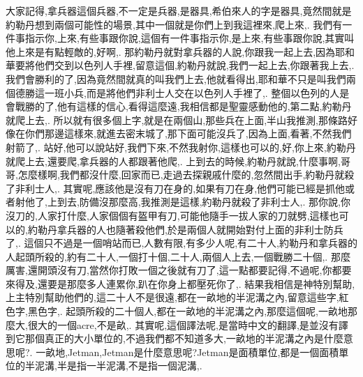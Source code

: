 \documentclass{book}
\begin{document}
大家記得,拿兵器這個兵器,不一定是兵器,是器具,希伯來人的字是器具,竟然間就是約勒丹想到兩個可能性的場景,其中一個就是你們上到我這裡來,爬上來,.
我們有一件事指示你,上來,有些事跟你說,這個有一件事指示你,是上來,有些事跟你說,其實叫他上來是有點輕敵的,好啊,.
那約勒丹就對拿兵器的人說,你跟我一起上去,因為耶和華要將他們交到以色列人手裡,留意這個,約勒丹就說,我們一起上去,你跟著我上去,.
我們會勝利的了,因為竟然間就真的叫我們上去,他就看得出,耶和華不只是叫我們兩個德勝這一班小兵,而是將他們非利士人交在以色列人手裡了,.
整個以色列的人是會戰勝的了,他有這樣的信心,看得這麼遠,我相信都是聖靈感動他的,第二點,約勒丹就爬上去,.
所以就有很多個上字,就是在兩個山,那些兵在上面,半山我推測,那條路好像在你們那邊這樣來,就進去密末城了,那下面可能沒兵了,因為上面,看著,不然我們射箭了,.
站好,他可以說站好,我們下來,不然我射你,這樣也可以的,好,你上來,約勒丹就爬上去,還要爬,拿兵器的人都跟著他爬,.
上到去的時候,約勒丹就說,什麼事啊,哥哥,怎麼樣啊,我們都沒什麼,回家而已,走過去探親戚什麼的,忽然間出手,約勒丹就殺了非利士人,.
其實呢,應該他是沒有刀在身的,如果有刀在身,他們可能已經是抓他或者射他了,上到去,防備沒那麼高,我推測是這樣,約勒丹就殺了非利士人,.
那你說,你沒刀的,人家打什麼,人家個個有盔甲有刀,可能他隨手一拔人家的刀就劈,這樣也可以的,約勒丹拿兵器的人也隨著殺他們,於是兩個人就開始對付上面的非利士防兵了,.
這個只不過是一個哨站而已,人數有限,有多少人呢,有二十人,約勒丹和拿兵器的人起頭所殺的,約有二十人,一個打十個,二十人,兩個人上去,一個戰勝二十個,.
那麼厲害,還開頭沒有刀,當然你打敗一個之後就有刀了,這一點都要記得,不過呢,你都要來得及,還要是那麼多人連累你,趴在你身上都壓死你了,.
結果我相信是神特別幫助,上主特別幫助他們的,這二十人不是很遠,都在一畝地的半泥溝之內,留意這些字,紅色字,黑色字,.
起頭所殺的二十個人,都在一畝地的半泥溝之內,那麼這個呢,一畝地那麼大,很大的一個acre,不是畝,.
其實呢,這個譯法呢,是當時中文的翻譯,是並沒有譯到它那個真正的大小單位的,不過我們都不知道多大,一畝地的半泥溝之內是什麼意思呢?.
一畝地,Jetman,Jetman是什麼意思呢?Jetman是面積單位,都是一個面積單位的半泥溝,半是指一半泥溝,不是指一個泥溝,.
\end{document}
